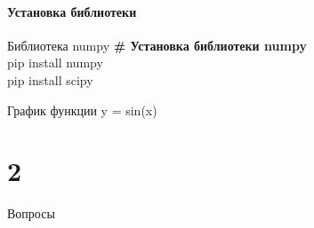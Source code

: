 \documentclass[12pt]{beamer}
\begin{document}
\subsection{Установка библиотеки}
\begin{frame}{Библиотека numpy}
\textbf{\# Установка библиотеки numpy} \\
\vspace{0.5cm}
pip install numpy \\
\vspace{0.2cm}
pip install scipy
\end{frame}


\begin{frame}{График функции y = sin(x)}

\end{frame}


\part{2}
\begin{frame}[t]{Вопросы}
\vspace{0.7cm}
 \\
\end{frame}
\end{document}
